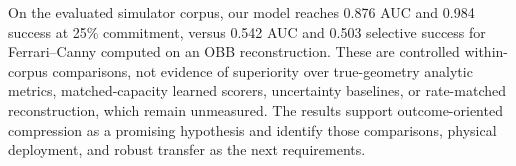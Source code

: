 \documentclass[letterpaper, 10pt, conference]{ieeeconf}
\begin{document}
On the evaluated simulator corpus, our model reaches 0.876 AUC and 0.984 success at 25\% commitment, versus 0.542 AUC and 0.503 selective success for Ferrari--Canny computed on an OBB reconstruction. These are controlled within-corpus comparisons, not evidence of superiority over true-geometry analytic metrics, matched-capacity learned scorers, uncertainty baselines, or rate-matched reconstruction, which remain unmeasured. The results support outcome-oriented compression as a promising hypothesis and identify those comparisons, physical deployment, and robust transfer as the next requirements.




\end{document}
